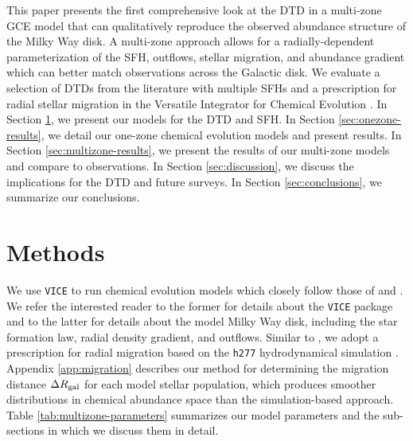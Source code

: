 \documentclass[twocolumn,twocolappendix,linenumbers,trackchanges]{aastex631}
\newcommand{\vice}{{\tt VICE}\xspace}
\begin{document}

This paper presents the first comprehensive look at the DTD in a multi-zone GCE model that can qualitatively reproduce the observed abundance structure of the Milky Way disk. A multi-zone approach allows for a radially-dependent parameterization of the SFH, outflows, stellar migration, and abundance gradient which can better match observations across the Galactic disk. We evaluate a selection of DTDs from the literature with multiple SFHs and a prescription for radial stellar migration in the Versatile Integrator for Chemical Evolution \citep[\vice;][]{JohnsonWeinberg2020-Starbursts}. In Section \ref{sec:methods}, we present our models for the DTD and SFH. In Section \ref{sec:onezone-results}, we detail our one-zone chemical evolution models and present results. In Section \ref{sec:multizone-results}, we present the results of our multi-zone models and compare to observations. In Section \ref{sec:discussion}, we discuss the implications for the DTD and future surveys. In Section \ref{sec:conclusions}, we summarize our conclusions.

\section{Methods}
\label{sec:methods}

We use \vice to run chemical evolution models which closely follow those of \citet{JohnsonWeinberg2020-Starbursts} and \citet[][hereafter ]{Johnson2021-Migration}. We refer the interested reader to the former for details about the \vice package and to the latter for details about the model Milky Way disk, including the star formation law, radial density gradient, and outflows. Similar to , we adopt a prescription for radial migration based on the {\tt h277} hydrodynamical simulation \citep{Christensen2012-h277}. Appendix \ref{app:migration} describes our method for determining the migration distance $\Delta R_{\rm gal}$ for each model stellar population, which produces smoother distributions in chemical abundance space than the simulation-based approach. Table \ref{tab:multizone-parameters} summarizes our model parameters and the sub-sections in which we discuss them in detail.
\end{document}
